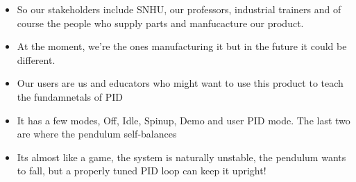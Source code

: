\documentclass[aspectratio=169]{beamer}
\begin{document}
\begin{frame}
{\begin{itemize}
 \item So our stakeholders include SNHU, our professors, industrial trainers and of course the people who supply parts and manfucacture our product.
 \item At the moment, we're the ones manufacturing it but in the future it could be different.
 \item Our users are us and educators who might want to use this product to teach the fundamnetals of PID
 \item It has a few modes, Off, Idle, Spinup, Demo and user PID mode. The last two are where the pendulum self-balances
 \item Its almost like a game, the system is naturally unstable, the pendulum wants to fall, but a properly tuned PID loop can keep it upright!
\end{itemize}
}

\end{frame}
\end{document}
